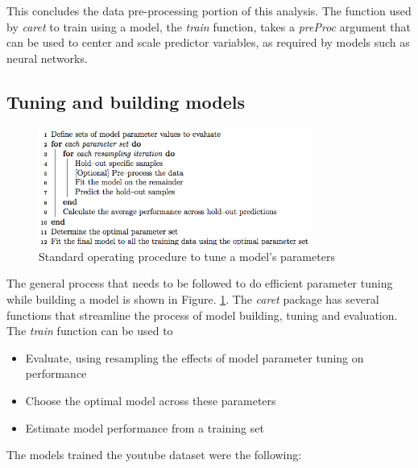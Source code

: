 \documentclass[letterpaper,12pt,titlepage,oneside,final]{report}
\begin{document}
            This concludes the data pre-processing portion of this analysis. The function used by \textit{caret} to train using a model, the \textit{train} function, takes a \textit{preProc} argument that can be used to center and scale predictor variables, as required by models such as neural networks.
        \subsection{Tuning and building models}
            \begin{figure}[!h]
                \centering
                \includegraphics[width=0.8\textwidth]{training}
                \caption{Standard operating procedure to tune a model's parameters \cite{Model99:online}}
                \label{training}
            \end{figure}

            The general process that needs to be followed to do efficient parameter tuning while building a model is shown in Figure. \ref{training}. The \textit{caret} package has several functions that streamline the process of model building, tuning and evaluation. The \textit{train} function can be used to 
            \begin{itemize}
                \item {Evaluate, using resampling the effects of model parameter tuning on performance}
                \item {Choose the optimal model across these parameters}
                \item{Estimate model performance from a training set}\cite{Model99:online}
            \end{itemize}
            
            The models trained the youtube dataset were the following:
\end{document}
